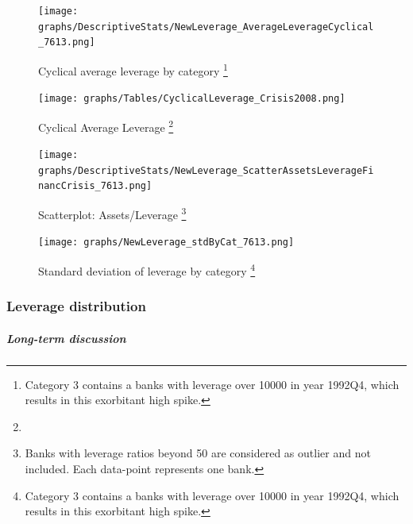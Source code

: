 \documentclass[12pt, a4paper]{article} %
\begin{document}
\begin{figure}[H]
\begin{minipage}{\textwidth}
\centering
\caption[1]{Cyclical average leverage by category \footnote{Category 3 contains a banks with leverage over 10000 in year 1992Q4, which results in this exorbitant high spike.}}
\texttt{[image: graphs/DescriptiveStats/NewLeverage\_AverageLeverageCyclical\_7613.png]}
\label{fig:averageLeverage_cyclical_Categories}
\end{minipage}
\end{figure}

\begin{figure}[H]
\begin{minipage}{\textwidth}
\centering
\caption[1]{Cyclical Average Leverage \footnote{}}
\texttt{[image: graphs/Tables/CyclicalLeverage\_Crisis2008.png]}
\label{table:CyclicalLeverageFinancCrisis}
\end{minipage}
\end{figure}

\begin{figure}[H]
\begin{minipage}{\textwidth}
\centering
\caption[1]{Scatterplot: Assets/Leverage \footnote{Banks with leverage ratios beyond 50 are considered as outlier and not included. Each data-point represents one bank. }}
\texttt{[image: graphs/DescriptiveStats/NewLeverage\_ScatterAssetsLeverageFinancCrisis\_7613.png]}
\label{fig:AssetsvsLeverageFinancCrisis}
\end{minipage}
\end{figure}


\begin{figure}[H]
\begin{minipage}{\textwidth}
\centering
\caption[1]{Standard deviation of leverage by category \footnote{Category 3 contains a banks with leverage over 10000 in year 1992Q4, which results in this exorbitant high spike.}}
\texttt{[image: graphs/NewLeverage\_stdByCat\_7613.png]}
\label{fig:averageLeverage_Std_Categories}
\end{minipage}
\end{figure}

\subsubsection{Leverage distribution}
\label{sec:LeverageDistribution}

\subparagraph{Long-term discussion}
\end{document}
